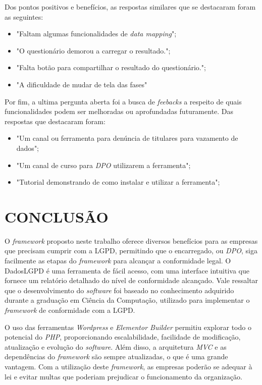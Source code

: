\documentclass[
	12pt,				%
	openright,			%
	oneside,			%
	a4paper,			%
	english,			%
	french,				%
	spanish,			%
	brazil,				%
	]{abntex2}
\begin{document}
Dos pontos positivos e benefícios, as respostas similares que se destacaram foram as seguintes: 
\begin{itemize}
 \item "Faltam algumas funcionalidades de \textit{data mapping}";
 \item "O questionário demorou a carregar o resultado.";
 \item "Falta botão para compartilhar o resultado do questionário.";
 \item "A dificuldade de mudar de tela das fases"
\end{itemize}

Por fim, a ultima pergunta aberta foi a busca de \textit{feebacks} a respeito de quais funcionalidades podem ser melhoradas ou aprofundadas futuramente. Das respostas que destacaram foram: 
\begin{itemize}
 \item "Um canal ou ferramenta para denúncia de titulares para vazamento de dados";
 \item "Um canal de curso para \textit{DPO} utilizarem a ferramenta";
 \item "Tutorial demonstrando de como instalar e utilizar a ferramenta";

\end{itemize}
 \chapter{CONCLUSÃO}
 \label{ch: conclusao}
O \textit{framework} proposto neste trabalho oferece diversos benefícios para as empresas que precisam cumprir com a LGPD, permitindo que o encarregado, ou \textit{DPO}, siga facilmente as etapas do \textit{framework} para alcançar a conformidade legal. O DadosLGPD é uma ferramenta de fácil acesso, com uma interface intuitiva que fornece um relatório detalhado do nível de conformidade alcançado. Vale ressaltar que o desenvolvimento do \textit{software} foi baseado no conhecimento adquirido durante a graduação em Ciência da Computação, utilizado para implementar o \textit{framework} de conformidade com a LGPD.


O uso das ferramentas \textit{Wordpress} e \textit{Elementor Builder} permitiu explorar todo o potencial do \textit{PHP}, proporcionando escalabilidade, facilidade de modificação, atualização e evolução do \textit{software}. Além disso, a arquitetura \textit{MVC} e as dependências do \textit{framework} são sempre atualizadas, o que é uma grande vantagem. Com a utilização deste \textit{framework}, as empresas poderão se adequar à lei e evitar multas que poderiam prejudicar o funcionamento da organização.
\end{document}
